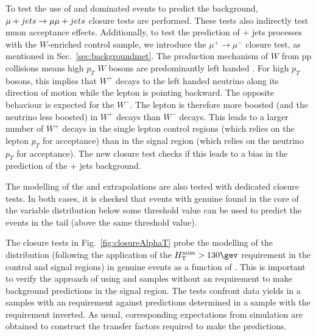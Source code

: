 To test the use of \wej and \ttbar dominated \mj events to predict the \znunu
background, $\mj \rightarrow \mmj$ closure tests are performed. These
tests also indirectly test muon acceptance effects. Additionally, to 
test the prediction of \znunu + jets processes with
the $W$-enriched \mj control sample, we introduce the
$\mu^{+}\rightarrow\mu^{-}$ closure test, as mentioned in
Sec.~\ref{sec:backgroundmet}. The production mechanism of $W$ from pp
collisions means high $p_T$ $W$ bosons are predominantly left handed
\cite{WPol}.  For high $p_T$ bosons, this implies that $W^+$ decays to
the left handed neutrino along its direction of motion while the
lepton is pointing backward. The opposite behaviour is expected for
the $W^-$. The lepton is therefore more boosted (and the neutrino less
boosted) in $W^+$ decays than $W^-$ decays.  This leads to a larger
number of $W^+$ decays in the single lepton control regions (which
relies on the lepton $p_T$ for acceptance) than in the signal region
(which relies on the neutrino $p_T$ for acceptance). The new closure
test checks if this leads to a bias in the prediction of the \znunu +
jets background. 

The modelling of the \alphat and
\bdphi extrapolations are also tested with dedicated closure tests. In both
cases, it is checked that events with genuine \met found in the core
of the variable distribution below some threshold value can be used to
predict the events in the tail (above the same threshold value). 

The closure tests in Fig.~\ref{fig:closureAlphaT} probe the modelling
of the \alphat distribution (following the application of the $\mht >
130\gev$ requirement in the control and signal regions) in genuine
\met events as a function of \scalht. This is important to verify the
approach of using \mj and \mmj samples without an \alphat requirement
to make background predictions in the signal region. The tests
confront data yields in a \mj  samples with an \alphat
requirement against predictions determined in a \mj sample with
the \alphat requirement inverted. As usual, corresponding expectations
from simulation are obtained to construct the transfer factors
required to make the predictions.

